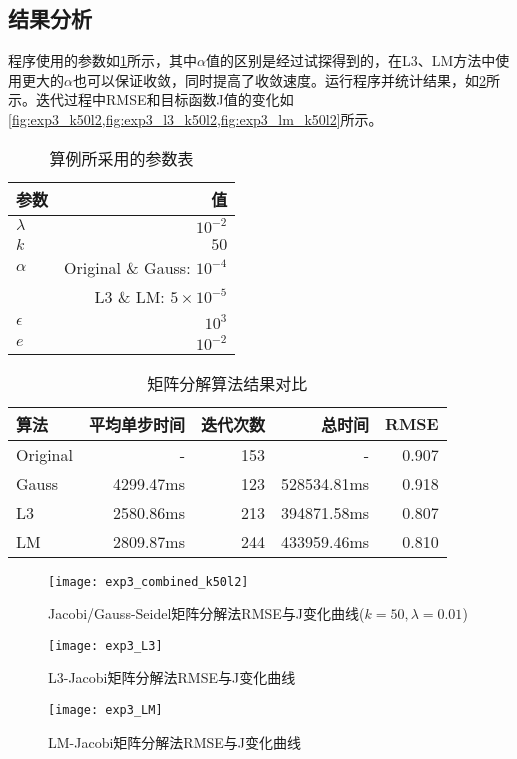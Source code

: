 \documentclass[a4paper,12pt]{article}
\begin{document}
    \subsection{结果分析}
    程序使用的参数如\cref{tbl:exp3para}所示，其中$\alpha$值的区别是经过试探得到的，在L3、LM方法中使用更大的$\alpha$也可以保证收敛，同时提高了收敛速度。运行程序并统计结果，如\cref{tbl:exp3}所示。迭代过程中RMSE和目标函数J值的变化如\cref{fig:exp3_k50l2,fig:exp3_l3_k50l2,fig:exp3_lm_k50l2}所示。

    \begin{table}
      \centering
      \caption{算例所采用的参数表}
      \label{tbl:exp3para}
      \begin{tabular}{lr}
        \toprule
        参数&值\\
        \midrule
        $\lambda$ & $10^{-2}$ \\
        $k$ & $50$ \\
        $\alpha$ & Original \& Gauss: $10^{-4}$\\
         & L3 \& LM: $5\times 10^{-5}$ \\
        $\epsilon$ & $10^{3}$ \\
        $e$ & $10^{-2}$ \\
        \bottomrule
      \end{tabular}
    \end{table}

    \begin{table}
      \centering
      \caption{矩阵分解算法结果对比}
      \label{tbl:exp3}
      \begin{tabular}{lrrrr}
        \toprule
        算法&平均单步时间&迭代次数&总时间&RMSE\\
        \midrule
        Original & - & 153 & - & 0.907 \\
        Gauss & 4299.47ms & 123 & 528534.81ms & 0.918 \\
        L3 & 2580.86ms & 213 & 394871.58ms & 0.807 \\
        LM & 2809.87ms & 244 & 433959.46ms & 0.810 \\
        \bottomrule
      \end{tabular}
    \end{table}

    \begin{figure}[htbp]
      \centering
      \texttt{[image: exp3\_combined\_k50l2]}
      \caption{Jacobi/Gauss-Seidel矩阵分解法RMSE与J变化曲线($k=50,\lambda=0.01$)}
      \label{fig:exp3_k50l2}
    \end{figure}
    \begin{figure}[htbp]
      \centering
      \texttt{[image: exp3\_L3]}
      \caption{L3-Jacobi矩阵分解法RMSE与J变化曲线}
      \label{fig:exp3_l3}
    \end{figure}
    \begin{figure}[htbp]
      \centering
      \texttt{[image: exp3\_LM]}
      \caption{LM-Jacobi矩阵分解法RMSE与J变化曲线}
      \label{fig:exp3_lm}
    \end{figure}
\end{document}
